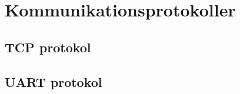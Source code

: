 
\chapter{Kommunikationsprotokoller}

\section{TCP protokol}
\label{TCPprotokol}

\section{UART protokol}
